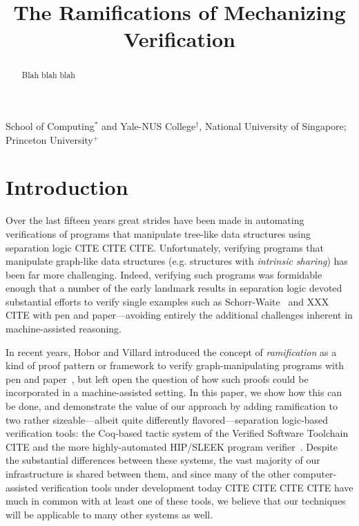 \documentclass[pldi]{sigplanconf-pldi15}
\begin{document}
%
%

\title{The Ramifications of Mechanizing Verification}
{}
{School of Computing$^{*}$ and Yale-NUS College$^{\dagger}$, National University of Singapore; Princeton University$^{+}$}

\maketitle
\begin{abstract}
Blah blah blah
\end{abstract}

\newcommand\hide[1]{}

\section{Introduction}
Over the last fifteen years great strides have been made in automating verifications of programs that manipulate
tree-like data structures using separation logic CITE CITE CITE.  Unfortunately, verifying programs that manipulate
graph-like data structures (e.g. structures with \emph{intrinsic sharing}) has been far more challenging.
Indeed, verifying such programs was formidable enough that a number of the early landmark results in separation logic
devoted substantial efforts to verify single examples such as Schorr-Waite~\cite{hongseok:phd} and XXX CITE with pen and
paper---avoiding entirely the additional challenges inherent in machine-assisted reasoning.

In recent years, Hobor and Villard introduced the concept of \emph{ramification} as a kind of proof pattern or framework
to verify graph-manipulating programs with pen and paper~\cite{hobor:ramification}, but left open the question of how such proofs could
be incorporated in a machine-assisted setting.  In this paper, we show how this can be done, and demonstrate the
value of our approach by adding ramification to two rather sizeable---albeit quite differently flavored---separation logic-based
verification tools: the Coq-based tactic system of the Verified Software Toolchain CITE and the more highly-automated HIP/SLEEK
program verifier~\cite{chin:hipsleek}.  Despite the substantial differences between these systems, the vast majority of our infrastructure is
shared between them, and since many of the other computer-assisted verification tools under development
today CITE CITE CITE CITE have much in common with at least one of these tools, we believe that our techniques will be
applicable to many other systems as well.
\end{document}
